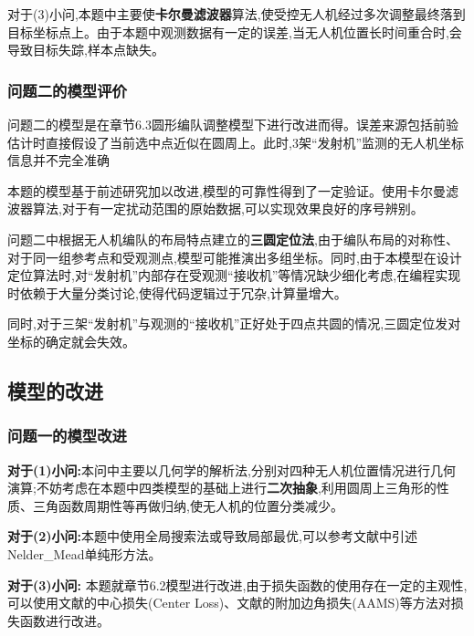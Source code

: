 \documentclass[withoutpreface,bwprint]{cumcmthesis}
\begin{document}
	对于(3)小问,本题中主要使\textbf{卡尔曼滤波器}算法,使受控无人机经过多次调整最终落到目标坐标点上。由于本题中观测数据有一定的误差,当无人机位置长时间重合时,会导致目标失踪,样本点缺失。
	
	\subsubsection{问题二的模型评价}
	
	问题二的模型是在章节6.3圆形编队调整模型下进行改进而得。误差来源包括前验估计时直接假设了当前选中点近似在圆周上。此时,3架“发射机”监测的无人机坐标信息并不完全准确
	
	
	本题的模型基于前述研究加以改进,模型的可靠性得到了一定验证。使用卡尔曼滤波器算法,对于有一定扰动范围的原始数据,可以实现效果良好的序号辨别。
	
	
	问题二中根据无人机编队的布局特点建立的\textbf{三圆定位法},由于编队布局的对称性、对于同一组参考点和受观测点,模型可能推演出多组坐标。同时,由于本模型在设计定位算法时,对“发射机”内部存在受观测“接收机”等情况缺少细化考虑,在编程实现时依赖于大量分类讨论,使得代码逻辑过于冗杂,计算量增大。
	
	同时,对于三架“发射机”与观测的“接收机”正好处于四点共圆的情况,三圆定位发对坐标的确定就会失效。
	
	\subsection{模型的改进}	
	
	\subsubsection{问题一的模型改进}
	
	\textbf{对于(1)小问:\quad}本问中主要以几何学的解析法,分别对四种无人机位置情况进行几何演算;不妨考虑在本题中四类模型的基础上进行\textbf{二次抽象},利用圆周上三角形的性质、三角函数周期性等再做归纳,使无人机的位置分类减少。
	
	\textbf{对于(2)小问:\quad}本题中使用全局搜索法或导致局部最优,可以参考文献\cite{singer2009nelder}中引述Nelder\_Mead单纯形方法。
	
	\textbf{对于(3)小问:\quad} 本题就章节6.2模型进行改进,由于损失函数的使用存在一定的主观性,可以使用文献\cite{cai2018exploring}的中心损失(Center Loss)、文献\cite{deng2019arcface}的附加边角损失(AAMS)等方法对损失函数进行改进。
\end{document}
